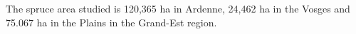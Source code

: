 \documentclass[3p,procedia]{elsarticle}
\begin{document}
The spruce area studied is 120,365 ha in Ardenne, 24,462 ha in the Vosges and 75.067 ha in the Plains in the Grand-Est region.

  
			












\end{document}
